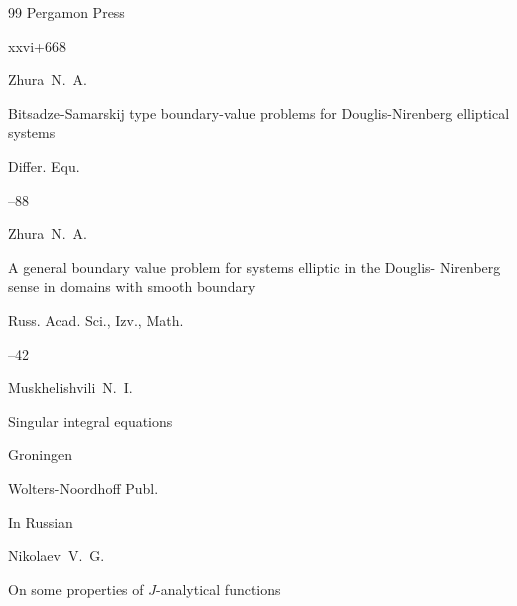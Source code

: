 \begin{thebibliography}{99}
\publ Pergamon Press 


\totalpages xxvi+668 








\by Zhura~N.~A.

\paper Bitsadze-Samarskij type boundary-value problems for Douglis-Nirenberg elliptical systems

\jour Differ. Equ.



--88 








\by Zhura~N.~A.

\paper A general boundary value problem for systems elliptic in the Douglis- Nirenberg sense in domains with smooth boundary

\jour Russ. Acad. Sci., Izv., Math. 



--42 







\by Muskhelishvili~N.~I.

\book Singular integral equations


\publaddr Groningen

\publ Wolters-Noordhoff Publ.






\lang In Russian

\by   Nikolaev~V.~G.

\paper On some properties of $J$-analytical functions


\end{thebibliography}
